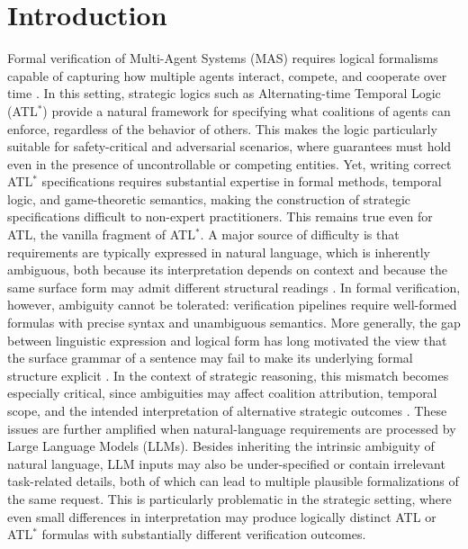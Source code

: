 \section{Introduction}

Formal verification of Multi-Agent Systems (MAS) requires logical formalisms capable of capturing how multiple agents interact, compete, and cooperate over time \cite{shoham2008multiagent,wooldridge2009introduction,DBLP:journals/tocl/MogaveroMPV14}. In this setting, strategic logics such as Alternating-time Temporal Logic (ATL$^\ast$) \cite{alur2002alternating} provide a natural framework for specifying what coalitions of agents can enforce, regardless of the behavior of others. This makes the logic particularly suitable for safety-critical and adversarial scenarios, where guarantees must hold even in the presence of uncontrollable or competing entities. Yet, writing correct ATL$^\ast$ specifications requires substantial expertise in formal methods, temporal logic, and game-theoretic semantics, making the construction of strategic specifications difficult to non-expert practitioners. This remains true even for ATL, the vanilla fragment of ATL$^\ast$. A major source of difficulty is that requirements are typically expressed in natural language, which is inherently ambiguous, both because its interpretation depends on context and because the same surface form may admit different structural readings \cite{saussure1916course,small2013lexical}. In formal verification, however, ambiguity cannot be tolerated: verification pipelines require well-formed formulas with precise syntax and unambiguous semantics. More generally, the gap between linguistic expression and logical form has long motivated the view that the surface grammar of a sentence may fail to make its underlying formal structure explicit \cite{frege1892sense,russell1905denoting,Russell1919-RUSTPO-65}. In the context of strategic reasoning, this mismatch becomes especially critical, since ambiguities may affect coalition attribution, temporal scope, and the intended interpretation of alternative strategic outcomes \cite{kulkarni2025dynamic}. These issues are further amplified when natural-language requirements are processed by Large Language Models (LLMs). Besides inheriting the intrinsic ambiguity of natural language, LLM inputs may also be under-specified or contain irrelevant task-related details, both of which can lead to multiple plausible formalizations of the same request. This is particularly problematic in the strategic setting, where even small differences in interpretation may produce logically distinct ATL or ATL$^\ast$ formulas with substantially different verification outcomes.

